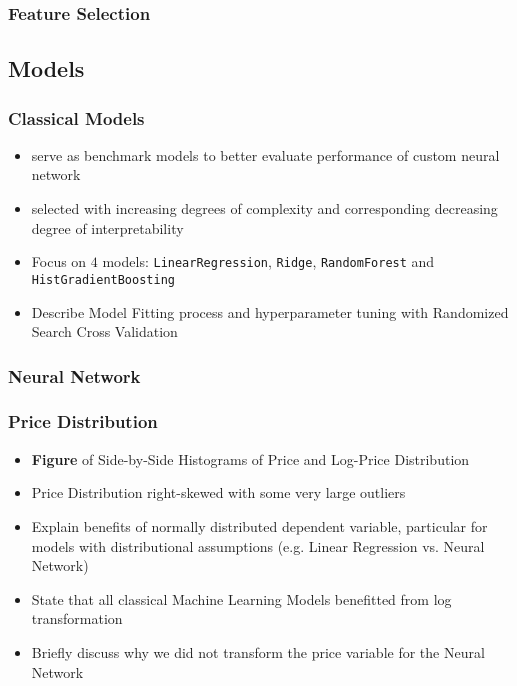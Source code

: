 \documentclass[12pt, letterpaper]{article}
\begin{document}
\subsubsection{Feature Selection} %


\subsection{Models} %

\subsubsection{Classical Models} %
\begin{itemize}
    \item serve as benchmark models to better evaluate performance of custom neural network
    \item selected with increasing degrees of complexity and corresponding decreasing degree of interpretability
    \item Focus on $4$ models: \texttt{LinearRegression}, \texttt{Ridge}, \texttt{RandomForest} and \texttt{HistGradientBoosting}
    \item Describe Model Fitting process and hyperparameter tuning with Randomized Search Cross Validation
\end{itemize}

\subsubsection{Neural Network} %


\subsubsection{Price Distribution} %
\begin{itemize}
    \item \textbf{Figure} of Side-by-Side Histograms of Price and Log-Price Distribution
    \item Price Distribution right-skewed with some very large outliers
    \item Explain benefits of normally distributed dependent variable, particular for models with distributional assumptions (e.g. Linear Regression vs. Neural Network)
    \item State that all classical Machine Learning Models benefitted from log transformation
    \item Briefly discuss why we did not transform the price variable for the Neural Network
\end{itemize}
\end{document}
